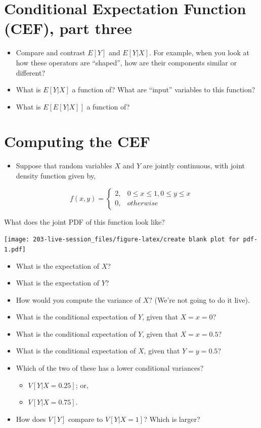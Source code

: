 \documentclass[
]{book}
\providecommand{\tightlist}{%
  \setlength{\itemsep}{0pt}\setlength{\parskip}{0pt}}
\theoremstyle{definition}
\theoremstyle{definition}
\theoremstyle{definition}
\theoremstyle{definition}
\theoremstyle{remark}
\begin{document}
\hypertarget{conditional-expectation-function-cef-part-three}{%
\section{Conditional Expectation Function (CEF), part three}\label{conditional-expectation-function-cef-part-three}}

\begin{itemize}
\tightlist
\item
  Compare and contrast \(E[Y]\) and \(E[Y|X]\). For example, when you look at how these operators are ``shaped'', how are their components similar or different?
\item
  What is \(E[Y|X]\) a function of? What are ``input'' variables to this function?
\item
  What is \(E[E[Y|X]]\) a function of?
\end{itemize}

\hypertarget{computing-the-cef}{%
\section{Computing the CEF}\label{computing-the-cef}}

\begin{itemize}
\tightlist
\item
  Suppose that random variables \(X\) and \(Y\) are jointly continuous, with joint density function given by,
\end{itemize}

\[
f(x,y) = 
  \begin{cases}
    2, & 0 \leq x \leq 1, 0 \leq y \leq x \\
    0, & otherwise
\end{cases}
\]

What does the joint PDF of this function look like?

\texttt{[image: 203-live-session\_files/figure-latex/create blank plot for pdf-1.pdf]}

\begin{itemize}
\tightlist
\item
  What is the expectation of \(X\)?
\item
  What is the expectation of \(Y\)?
\item
  How would you compute the variance of \(X\)? (We're not going to do it live).
\item
  What is the conditional expectation of \(Y\), given that \(X=x=0\)?
\item
  What is the conditional expectation of \(Y\), given that \(X=x=0.5\)?
\item
  What is the conditional expectation of \(X\), given that \(Y=y=0.5\)?
\item
  Which of the two of these has a lower conditional variances?

  \begin{itemize}
  \tightlist
  \item
    \(V[Y|X=0.25]\); or,
  \item
    \(V[Y|X=0.75]\).
  \end{itemize}
\item
  How does \(V[Y]\) compare to \(V[Y|X=1]\)? Which is larger?
\end{itemize}
\end{document}
